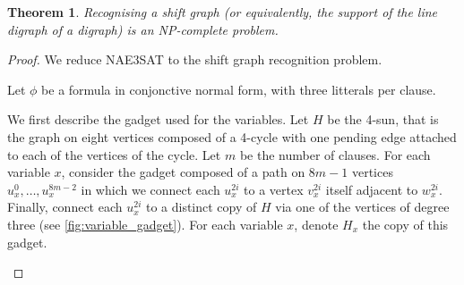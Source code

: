 \documentclass[11pt,a4aper]{article}
\newtheorem{theorem}{Theorem}
\begin{document}
\begin{theorem}
  Recognising a shift graph (or equivalently, the support of the line digraph of
  a digraph) is an NP-complete problem.
\end{theorem}
\begin{proof}
  We reduce \textsc{NAE3SAT} to the shift graph recognition problem.

  Let $\phi$ be a formula in conjonctive normal form, with three litterals per
  clause.

  We first describe the gadget used for the variables. Let $H$ be the 4-sun,
  that is the graph on eight vertices composed of a 4-cycle with one pending
  edge attached to each of the vertices of the cycle. Let $m$ be the number of
  clauses. For each variable $x$, consider the gadget composed of a path on
  $8m-1$ vertices $u_x^0, \dots, u_x^{8m-2}$ in which we connect each $u_x^{2i}$
  to a vertex $v_x^{2i}$ itself adjacent to $w_x^{2i}$. Finally, connect each
  $u_x^{2i}$ to a distinct copy of $H$ via one of the vertices of degree three (see
  \cref{fig:variable_gadget}). For each variable $x$, denote $H_x$ the copy of
  this gadget.

  \begin{figure}[h!]
    \centering
\end{figure}
\end{proof}
\end{document}

